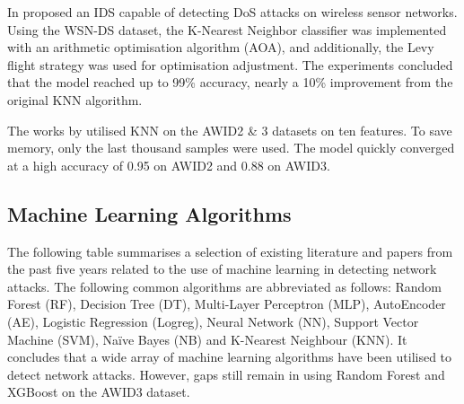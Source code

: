 In \textcite{s22041407} proposed an IDS capable of detecting DoS attacks on wireless sensor networks. Using the WSN-DS dataset, the K-Nearest Neighbor classifier was implemented with an arithmetic optimisation algorithm (AOA), and additionally, the Levy flight strategy was used for optimisation adjustment. The experiments concluded that the model reached up to 99\% accuracy, nearly a 10\% improvement from the original KNN algorithm.

The works by \textcite{10150/666297} utilised KNN on the AWID2 \& 3 datasets on ten features. To save memory, only the last thousand samples were used. The model quickly converged at a high accuracy of 0.95 on AWID2 and 0.88 on AWID3. 

\subsection{Machine Learning Algorithms}

The following table summarises a selection of existing literature and papers from the past five years related to the use of machine learning in detecting network attacks. The following common algorithms are abbreviated as follows: Random Forest (RF), Decision Tree (DT), Multi-Layer Perceptron (MLP), AutoEncoder (AE), Logistic Regression (Logreg), Neural Network (NN), Support Vector Machine (SVM), Naïve Bayes (NB) and K-Nearest Neighbour (KNN). It concludes that a wide array of machine learning algorithms have been utilised to detect network attacks. However, gaps still remain in using Random Forest and XGBoost on the AWID3 dataset.


